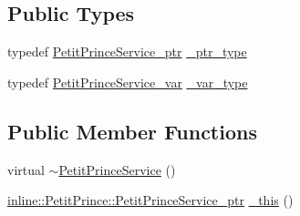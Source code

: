 \subsection*{Public Types}
\begin{DoxyCompactItemize}
\item 
typedef \hyperlink{_petit_prince_8hpp_ab3f2faea527950fdeeb9a681c381942f}{Petit\+Prince\+Service\+\_\+ptr} \hyperlink{class_petit_prince_service_ad60338094e415ea827c80f317cdb4f99}{\+\_\+ptr\+\_\+type}
\item 
typedef \hyperlink{_petit_prince_8hpp_ab062d31ce32e3867d5acebf95a617d4f}{Petit\+Prince\+Service\+\_\+var} \hyperlink{class_petit_prince_service_a2c52498ad60e7e4405e4132c387cb019}{\+\_\+var\+\_\+type}
\end{DoxyCompactItemize}
\subsection*{Public Member Functions}
\begin{DoxyCompactItemize}
\item 
virtual \hyperlink{class_petit_prince_service_ae7dbaf6923573f2b54cbebd27631387b}{$\sim$\+Petit\+Prince\+Service} ()
\item 
\hyperlink{_petit_prince_8hpp_ab3f2faea527950fdeeb9a681c381942f}{inline\+::\+Petit\+Prince\+::\+Petit\+Prince\+Service\+\_\+ptr} \hyperlink{class_petit_prince_service_abe6989f4776d705984b2ac81e2f5e790}{\+\_\+this} ()
\end{DoxyCompactItemize}

